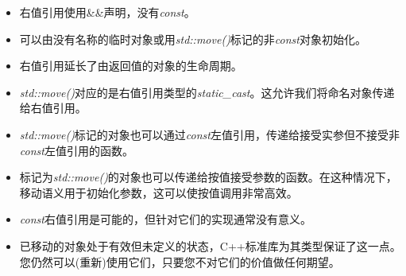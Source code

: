 \begin{itemize}
	\item 右值引用使用\&\&声明，没有\textit{const}。
	\item 可以由没有名称的临时对象或用\textit{std::move()}标记的非\textit{const}对象初始化。
	\item 右值引用延长了由返回值的对象的生命周期。
	\item \textit{std::move()}对应的是右值引用类型的\textit{static_cast}。这允许我们将命名对象传递给右值引用。
	\item \textit{std::move()}标记的对象也可以通过\textit{const}左值引用，传递给接受实参但不接受非\textit{const}左值引用的函数。
	\item 标记为\textit{std::move()}的对象也可以传递给按值接受参数的函数。在这种情况下，移动语义用于初始化参数，这可以使按值调用非常高效。
	\item \textit{const}右值引用是可能的，但针对它们的实现通常没有意义。
	\item 已移动的对象处于有效但未定义的状态，C++标准库为其类型保证了这一点。您仍然可以(重新)使用它们，只要您不对它们的价值做任何期望。
\end{itemize}

